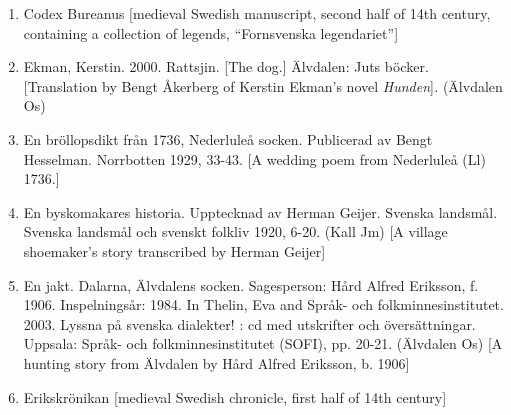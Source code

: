 \begin{enumerate}
\item 
\label{bkm:Ref137883429}Codex Bureanus [medieval Swedish manuscript, second half of 14th century, containing a collection of legends, “Fornsvenska legendariet”] 

\item 
\label{bkm:Ref141167264}\label{bkm:Ref150315907}Ekman, Kerstin. 2000. Rattsjin. [The dog.] Älvdalen: Juts böcker. [Translation by Bengt Åkerberg of Kerstin Ekman’s novel \textit{Hunden}]\textit{.} (Älvdalen Os)
\item 
\label{bkm:Ref137881221}En bröllopsdikt från 1736, Nederluleå socken. Publicerad av Bengt Hesselman. Norrbotten 1929, 33-43. [A wedding poem from Nederluleå (Ll) 1736.]

\item 
\label{bkm:Ref150587790}En byskomakares historia. Upptecknad av Herman Geijer. Svenska landsmål. Svenska landsmål och svenskt folkliv 1920, 6-20. (Kall Jm) [A village shoemaker’s story transcribed by Herman Geijer]
\item 
\label{bkm:Ref155589051}En jakt. Dalarna, Älvdalens socken. Sagesperson: Hård Alfred Eriksson, f. 1906. Inspelningsår: 1984. In Thelin, Eva and Språk- och folkminnesinstitutet. 2003. Lyssna på svenska dialekter! : cd med utskrifter och översättningar. Uppsala: Språk- och folkminnesinstitutet (SOFI), pp. 20-21. (Älvdalen Os) [A hunting story from Älvdalen by Hård Alfred Eriksson, b. 1906]

\item 
\label{bkm:Ref154220139}Erikskrönikan [medieval Swedish chronicle, first half of 14th century]


\end{enumerate}
